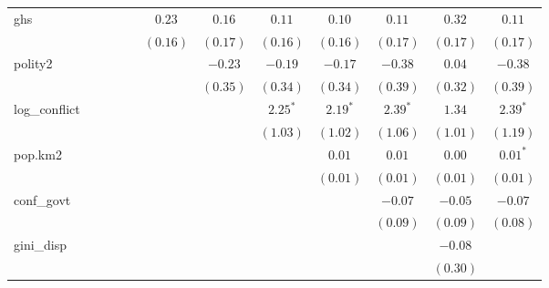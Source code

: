\documentclass[
]{article}
\begin{document}
\begin{sidewaystable}
\begin{center}
\begin{tabular}{l c c c c c c c c c c c}
ghs                       &             &            &            &              & $0.23$       & $0.16$       & $0.11$       & $0.10$       & $0.11$       & $0.32$      & $0.11$        \\
                          &             &            &            &              & $(0.16)$     & $(0.17)$     & $(0.16)$     & $(0.16)$     & $(0.17)$     & $(0.17)$    & $(0.17)$      \\
polity2                   &             &            &            &              &              & $-0.23$      & $-0.19$      & $-0.17$      & $-0.38$      & $0.04$      & $-0.38$       \\
                          &             &            &            &              &              & $(0.35)$     & $(0.34)$     & $(0.34)$     & $(0.39)$     & $(0.32)$    & $(0.39)$      \\
log\_conflict             &             &            &            &              &              &              & $2.25^{*}$   & $2.19^{*}$   & $2.39^{*}$   & $1.34$      & $2.39^{*}$    \\
                          &             &            &            &              &              &              & $(1.03)$     & $(1.02)$     & $(1.06)$     & $(1.01)$    & $(1.19)$      \\
pop.km2                   &             &            &            &              &              &              &              & $0.01$       & $0.01$       & $0.00$      & $0.01^{*}$    \\
                          &             &            &            &              &              &              &              & $(0.01)$     & $(0.01)$     & $(0.01)$    & $(0.01)$      \\
conf\_govt                &             &            &            &              &              &              &              &              & $-0.07$      & $-0.05$     & $-0.07$       \\
                          &             &            &            &              &              &              &              &              & $(0.09)$     & $(0.09)$    & $(0.08)$      \\
gini\_disp                &             &            &            &              &              &              &              &              &              & $-0.08$     &               \\
                          &             &            &            &              &              &              &              &              &              & $(0.30)$    &               \\

\end{tabular}
\end{center}
\end{sidewaystable}
\end{document}
